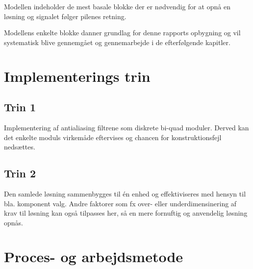 
Modellen indeholder de mest basale blokke der er nødvendig for at opnå en løsning og signalet følger pilenes retning.

Modellens enkelte blokke danner grundlag for denne rapports opbygning og vil systematisk blive gennemgået og gennemarbejde i de efterfølgende kapitler.


\section{Implementerings trin}

\subsection{Trin 1}
Implementering af antialiasing filtrene som diskrete bi-quad moduler. 
Derved kan det enkelte moduls virkemåde eftervises og chancen for konstruktionsfejl nedsættes.

\subsection{Trin 2}
Den samlede løsning sammenbygges til én enhed og effektiviseres med hensyn til bla. komponent valg. 
Andre faktorer som fx over- eller underdimensinering af krav til løsning kan også tilpasses her, så en mere fornuftig og anvendelig løsning opnås.


\section{Proces- og arbejdsmetode}
